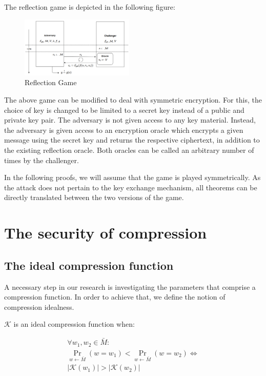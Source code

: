 \documentclass[conference, letterpaper, 10pt]{IEEEtran}
\begin{document}
The reflection game is depicted in the following figure:

   \begin{figure}[thpb]
      \centering
      \includegraphics[width=0.48\textwidth]{reflection_game.png}
      \caption{Reflection Game}
   \end{figure}


The above game can be modified to deal with symmetric encryption. For this, the
choice of key is changed to be limited to a secret key instead of a public and
private key pair. The adversary is not given access to any key material.
Instead, the adversary is given access to an encryption oracle which encrypts a
given message using the secret key and returns the respective ciphertext, in
addition to the existing reflection oracle. Both oracles can be called an
arbitrary number of times by the challenger.

In the following proofs, we will assume that the game is played symmetrically.
As the attack does not pertain to the key exchange mechanism, all theorems can
be directly translated between the two versions of the game.

\section{The security of compression}\label{sec:comsec}

\subsection{The ideal compression function}

A necessary step in our research is investigating the parameters that comprise a
compression function. In order to achieve that, we define the notion of
compression idealness.

$\mathcal{K}$ is an ideal compression function when:

\begin{equation*}
\begin{split}
\forall w_1, w_2 \in \bar{M}:\\
\Pr_{w \leftarrow \bar{M}}(w = w_1) < \Pr_{w \leftarrow \bar{M}}(w = w_2)
\iff\\
\lvert\mathcal{K}(w_1)\rvert > \lvert\mathcal{K}(w_2)\rvert
\end{split}
\end{equation*}
\end{document}
